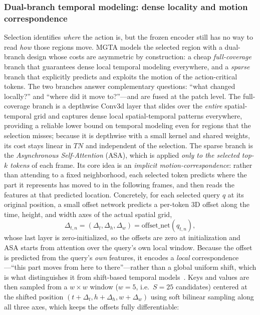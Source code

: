 \subsubsection{Dual-branch temporal modeling: dense locality and motion correspondence}
Selection identifies \emph{where} the action is, but the frozen encoder still has no way to read \emph{how} those regions move. MGTA models the selected region with a dual-branch design whose costs are asymmetric by construction: a cheap \emph{full-coverage} branch that guarantees dense local temporal modeling everywhere, and a \emph{sparse} branch that explicitly predicts and exploits the motion of the action-critical tokens. The two branches answer complementary questions: ``what changed locally?'' and ``where did it move to?''---and are fused at the patch level.
The full-coverage branch is a depthwise Conv3d layer that slides over the \emph{entire} spatial-temporal grid and captures dense local spatial-temporal patterns everywhere, providing a reliable lower bound on temporal modeling even for regions that the selection misses; because it is depthwise with a small kernel and shared weights, its cost stays linear in $T N$ and independent of the selection.
The sparse branch is the \emph{Asynchronous Self-Attention} (ASA), which is applied \emph{only to the selected top-$k$ tokens} of each frame. Its core idea is an \emph{implicit motion-correspondence}: rather than attending to a fixed neighborhood, each selected token predicts where the part it represents has moved to in the following frames, and then reads the features at that predicted location. Concretely, for each selected query $q$ at its original position, a small offset network predicts a per-token 3D offset along the time, height, and width axes of the actual spatial grid,
\begin{equation}
  \Delta_{t,n} = (\Delta_t, \Delta_h, \Delta_w) = \mathrm{offset\_net}(q_{t,n}),
  \label{eq:sata-offset}
\end{equation}
whose last layer is zero-initialized, so the offsets are zero at initialization and ASA starts from attention over the query's own local window. Because the offset is predicted from the query's \emph{own} features, it encodes a \emph{local} correspondence---``this part moves from here to there''---rather than a global uniform shift, which is what distinguishes it from shift-based temporal models~\cite{lin2019tsm}.
Keys and values are then sampled from a $w \times w$ window ($w=5$, i.e.\ $S=25$ candidates) centered at the shifted position $(t + \Delta_t, h + \Delta_h, w + \Delta_w)$ using soft bilinear sampling along all three axes, which keeps the offsets fully differentiable:
